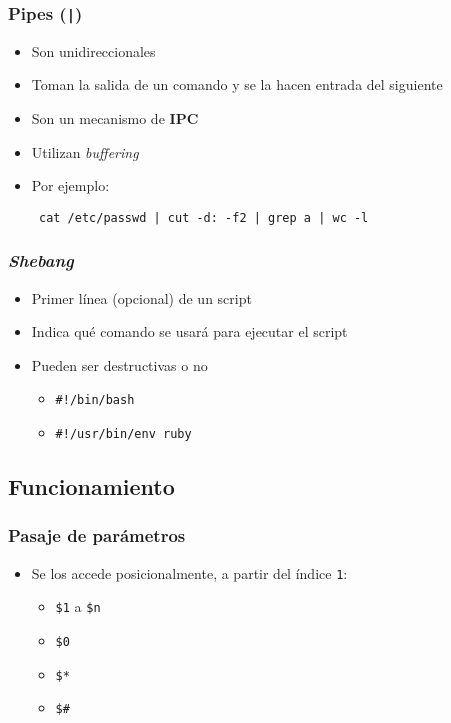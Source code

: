 \begin{frame}[fragile]
  \frametitle{Pipes (\texttt{|})}
  \begin{itemize}
    \item Son unidireccionales
    \item Toman la salida de un comando y se la hacen entrada del siguiente
    \item Son un mecanismo de \textbf{IPC}
    \item Utilizan \textit{buffering}
    \item Por ejemplo:
   \begin{lstlisting}
 cat /etc/passwd | cut -d: -f2 | grep a | wc -l
   \end{lstlisting}
  \end{itemize}
\end{frame}

\begin{frame}
  \frametitle{\textit{Shebang}}
  \begin{itemize}
    \item Primer línea (opcional) de un script
    \item Indica qué comando se usará para ejecutar el script
    \item Pueden ser destructivas o no
    \begin{itemize}
      \item \texttt{\#!/bin/bash}
      \item \texttt{\#!/usr/bin/env ruby}
    \end{itemize}
  \end{itemize}
\end{frame}

\subsection{Funcionamiento}

\begin{frame}
  \frametitle{Pasaje de parámetros}
  \begin{itemize}
    \item Se los accede posicionalmente, a partir del índice \texttt{1}:
    \begin{itemize}
      \item \texttt{\$1} a \texttt{\$n}
      \item \texttt{\$0}
      \item \texttt{\$*}
      \item \texttt{\$\#}
    \end{itemize}
  \end{itemize}
\end{frame}

